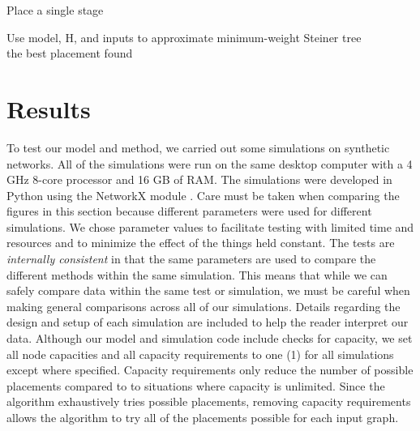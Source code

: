 \documentclass{acmart}
\begin{document}
	\begin{algorithm}
	\caption{Place a single stage}\label{placestage}
	\begin{algorithmic}[1]
	                \State Use model, H, and inputs to approximate minimum-weight Steiner tree
	            \EndIf
	        \EndFor \\
	        \Return the best placement found 
	    \EndProcedure
	\end{algorithmic}
	\end{algorithm}
	
	\section{Results}
	To test our model and method, we carried out some simulations on synthetic networks. All of the simulations were run on the same desktop computer with a 4 GHz 8-core processor and 16 GB of RAM. The simulations were developed in Python using the NetworkX module \cite{Hagberg2008ExploringNS}.
	Care must be taken when comparing the figures in this section because different parameters were used for different simulations. We chose parameter values to facilitate testing with limited time and resources and to minimize the effect of the things held constant. The tests are \textit{internally consistent} in that the same parameters are used to compare the different methods within the same simulation. This means that while we can safely compare data within the same test or simulation, we must be careful when making general comparisons across all of our simulations. Details regarding the design and setup of each simulation are included to help the reader interpret our data. Although our model and simulation code include checks for capacity, we set all node capacities and all capacity requirements to one (1) for all simulations except where specified. Capacity requirements only reduce the number of possible placements compared to to situations where capacity is unlimited. Since the algorithm exhaustively tries possible placements, removing capacity requirements allows the algorithm to try all of the placements possible for each input graph.
	
\end{document}

